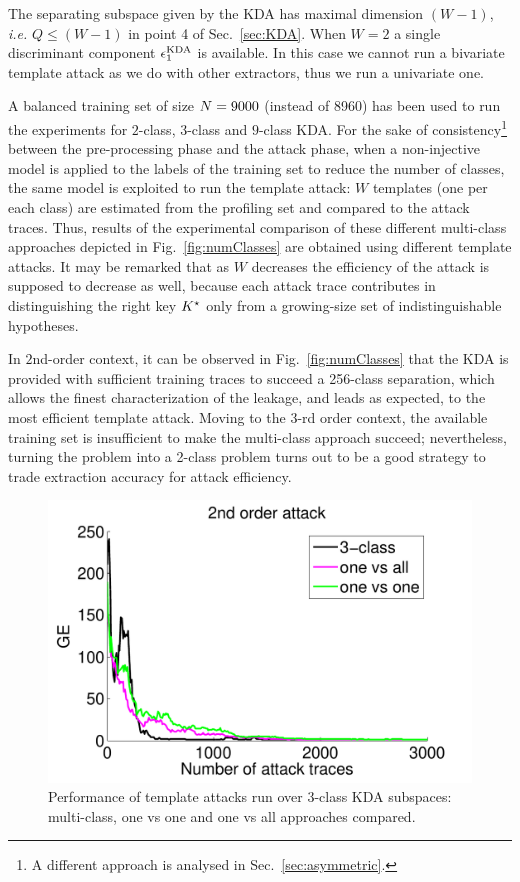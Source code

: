 \begin{remark}\label{rem:numComp}
The separating subspace given by the KDA has maximal dimension $(W-1)$, \emph{i.e.} $Q\leq (W-1)$ in point 4 of Sec.~\ref{sec:KDA}. When $W=2$ a single discriminant component $\epsilon^{\mathrm{KDA}}_1$ is available. In this case we cannot run a bivariate template attack as we do with other extractors, thus we run a univariate one. \\
\end{remark}


A balanced training set of size $N=9000$ (instead of 8960) has been used to run the experiments for $2$-class, $3$-class and $9$-class KDA. For the sake of consistency\footnote{A different approach is analysed in Sec.~\ref{sec:asymmetric}.} between the pre-processing phase and the attack phase, when a non-injective model is applied to the labels of the training set to reduce the number of classes, the same model is exploited to run the template attack: $W$ templates (one per each class) are estimated from the profiling set and compared to the attack traces. Thus, results of the experimental comparison of these different multi-class approaches depicted in  Fig.~\ref{fig:numClasses} are obtained using different template attacks. It may be remarked that as $W$ decreases the efficiency of the attack is supposed to decrease as well, because each attack trace contributes in distinguishing the right key $K^\star$ only from a growing-size set of indistinguishable hypotheses. 


 
In $2$nd-order context, it can be observed in Fig.~\ref{fig:numClasses} that the KDA is provided with sufficient training traces to succeed a 256-class separation, which allows the finest characterization of the leakage, and leads as expected, to the most efficient template attack. Moving to the $3$-rd order context, the available training set is insufficient to make the multi-class approach succeed; nevertheless, turning the problem into a 2-class problem turns out to be a good strategy to trade extraction accuracy for attack efficiency.






\begin{figure}
\centering
\includegraphics[width=.5\textwidth]{../Figures/CARDIS2016/2order_MULT.pdf}
\caption[KDA: comparison between multi-class, one vs one and one vs all approaches.]{Performance of template attacks run over 3-class KDA subspaces: multi-class, one vs one and one vs all approaches compared.}\label{fig:3multi-class}
\end{figure}

